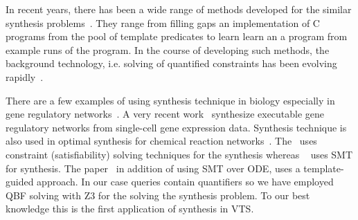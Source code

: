 In recent years, there has been a wide range of methods
developed for the similar synthesis problems~\cite{sketch,sygus,exampleSynth}.
%
They range from filling gaps an implementation of C programs from the
pool of template predicates to learn learn an a program from example
runs of the program.
%
In the course of developing such methods,
the background technology, i.e. solving of quantified
constraints has been evolving rapidly~\cite{lonsing2010depqbf,z3Quant}.

There are a few examples of using synthesis technique in biology especially in gene regulatory networks~\cite{shavit2016automated, fisher2015synthesising}. A very recent work~\cite{fisher2015synthesising} synthesize executable gene regulatory networks from single-cell gene expression data. 
Synthesis technique is also used in optimal synthesis for chemical reaction networks~\cite{cardelli2017syntax}. The~\cite{fisher2015synthesising} uses constraint (satisfiability) solving techniques for the synthesis whereas ~\cite{shavit2016automated} uses SMT for synthesis. The paper~\cite{cardelli2017syntax} in addition of using SMT over ODE, uses a template-guided approach. In our case queries contain quantifiers so we have employed QBF solving with Z3 for the solving the synthesis problem. To our best knowledge this is the first application of synthesis in VTS.
